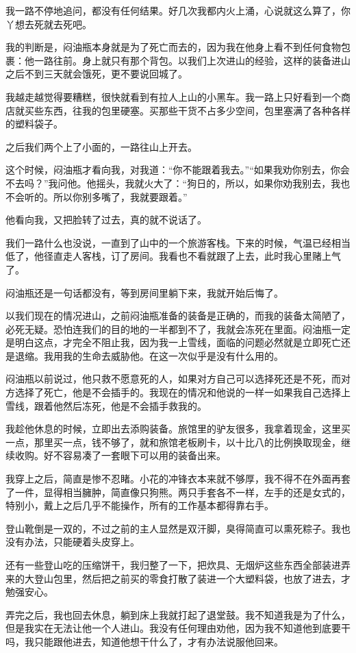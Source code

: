 我一路不停地追问，都没有任何结果。好几次我都内火上涌，心说就这么算了，你丫想去死就去死吧。

我的判断是，闷油瓶本身就是为了死亡而去的，因为我在他身上看不到任何食物包裹：他一路往前。身上就只有那个背包。以我们上次进山的经验，这样的装备进山之后不到三天就会饿死，更不要说回城了。

我越走越觉得要糟糕，很快就看到有拉人上山的小黑车。我一路上只好看到一个商店就买些东西，往我的包里硬塞。买那些干货不占多少空间，包里塞满了各种各样的塑料袋子。

之后我们两个上了小面的，一路往山上开去。

这个时候，闷油瓶才看向我，对我道：“你不能跟着我去。”“如果我劝你别去，你会不去吗？”我问他。他摇头，我就火大了：“狗日的，所以，如果你劝我别去，我也不会听的。所以你别多嘴了，我就要跟着。”

他看向我，又把脸转了过去，真的就不说话了。

我们一路什么也没说，一直到了山中的一个旅游客栈。下来的时候，气温已经相当低了，他径直走人客栈，订了房间。我看也不看就跟了上去，此时我心里赌上气了。

闷油瓶还是一句话都没有，等到房间里躺下来，我就开始后悔了。

以我们现在的情况进山，之前闷油瓶准备的装备是正确的，而我的装备太简陋了，必死无疑。恐怕连我们的目的地的一半都到不了，我就会冻死在里面。闷油瓶一定是明白这点，才完全不阻止我，因为我一上雪线，面临的问题必然就是立即死亡还是退缩。我用我的生命去威胁他。在这一次似乎是没有什么用的。

闷油瓶以前说过，他只救不愿意死的人，如果对方自己可以选择死还是不死，而对方选择了死亡，他是不会插手的。我现在的情况和他说的一样一如果我自己选择上雪线，跟着他然后冻死，他是不会插手救我的。

我趁他休息的时候，立即出去添购装备。旅馆里的驴友很多，我拿着现金，这里买一点，那里买一点，钱不够了，就和旅馆老板刷卡，以十比八的比例换取现金，继续收购。好不容易凑了一套眼下可以用的装备出来。

我穿上之后，简直是惨不忍睹。小花的冲锋衣本来就不够厚，我不得不在外面再套了一件，显得相当臃肿，简直像只狗熊。两只手套各不一样，左手的还是女式的，特别小，戴上之后几乎不能操作，所有的工作基本都得靠右手。

登山靴倒是一双的，不过之前的主人显然是双汗脚，臭得简直可以熏死粽子。我也没有办法，只能硬着头皮穿上。

还有一些登山吃的压缩饼干，我归整了一下，把炊具、无烟炉这些东西全部装进弄来的大登山包里，然后把之前买的零食打散了装进一个大塑料袋，也放了进去，才勉强安心。

弄完之后，我也回去休息，躺到床上我就打起了退堂鼓。我不知道我是为了什么，但是我实在无法让他一个人进山。我没有任何理由劝他，因为我不知道他到底要干吗，我只能跟他进去，知道他想干什么了，才有办法说服他回来。

